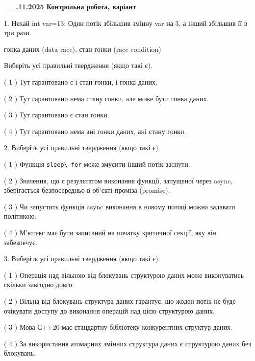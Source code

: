 \documentclass[12pt, ukrainian]{article}
\def\code#1{\Verb!#1!}
\begin{document}
\newpage
\begin {large}

\textbf{\_\_.11.2025 Контрольна робота, варіант  }\par


{
1. Нехай int var=13; Один потік збільшив змінну var на 3, а інший збільшив її в три рази.

гонка даних (data race), стан гонки (race condition)

Виберіть усі правильні твердження (якщо такі є).\par
\vspace{2mm}
( 1 ) Тут гарантовано є і стан гонки, і гонка даних.%

( 2 ) Тут гарантовано нема стану гонки, але може бути гонка даних.%

( 3 ) Тут гарантовано є стан гонки.%

( 4 ) Тут гарантовано нема ані гонки даних, ані стану гонки.%


2. Виберіть усі правильні твердження (якщо такі є).\par
\vspace{2mm}

( 1 ) Функція \code{sleep\_for} може змусити інший потік заснути.%

( 2 ) Значення, що є результатом виконання функції, запущеної через async, зберігається безпосередньо в об’єкті проміза (promise).%

( 3 ) Чи запустить функція  async виконання в новому потоці можна задавати політикою.%

( 4 ) М’ютекс має бути записаний на початку критичної секції, яку він забезпечує.%


3. Виберіть усі правильні твердження (якщо такі є).\par
\vspace{2mm}

( 1 ) Операція над вільною від блокувань структурою даних може виконуватись скільки завгодно довго.%

( 2 ) Вільна від блокувань структура даних гарантує, що жоден потік не буде очікувати доступу до виконання операцій над цією структурою даних.%

( 3 ) Мова С++20 має стандартну бібліотеку конкурентних структур даних.%

( 4 ) За використання атомарних змінних структура даних є структурою даних без блокувань.%


}
\end{large}
\end{document}
